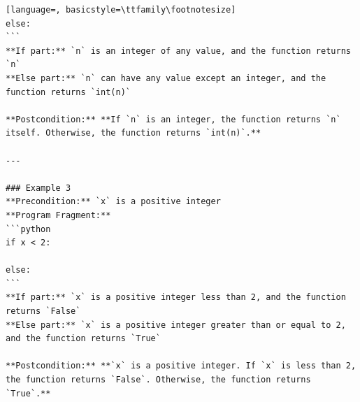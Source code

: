 \documentclass[sigconf]{acmart}
\begin{document}
\begin{tcolorbox}[ colback=gray!10, colframe=black, arc=5pt]
\begin{lstlisting}[language=, basicstyle=\ttfamily\footnotesize]
else:
```
**If part:** `n` is an integer of any value, and the function returns `n`  
**Else part:** `n` can have any value except an integer, and the function returns `int(n)`  

**Postcondition:** **If `n` is an integer, the function returns `n` itself. Otherwise, the function returns `int(n)`.**

---

### Example 3  
**Precondition:** `x` is a positive integer  
**Program Fragment:**  
```python
if x < 2:
    
else:
```
**If part:** `x` is a positive integer less than 2, and the function returns `False`  
**Else part:** `x` is a positive integer greater than or equal to 2, and the function returns `True`  

**Postcondition:** **`x` is a positive integer. If `x` is less than 2, the function returns `False`. Otherwise, the function returns `True`.**


\end{lstlisting}
\end{tcolorbox}
\end{document}
